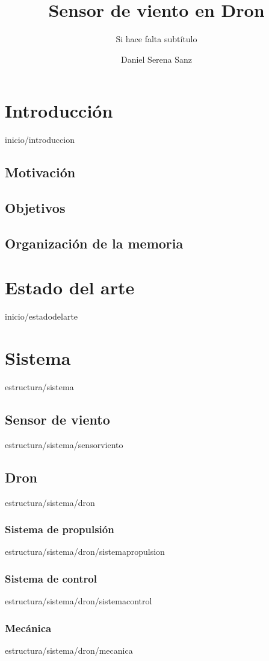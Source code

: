 \documentclass[epsbased,copyright,final,printable,covers,extendedindex,firstnumbered,tfg,gnuplot]{tfgtfmthesisuam}
\title{Sensor de viento en Dron}
\subtitle{Si hace falta subtítulo}
\author{Daniel Serena Sanz}
\begin{document}
\chapter{Introducción\label{CAP:INTRODUCCION}}{inicio/introduccion}
	\section{Motivación}
	\section{Objetivos}
	\section{Organización de la memoria}
\chapter{Estado del arte\label{CAP:ESTADODELARTE}}{inicio/estadodelarte}
\chapter{Sistema\label{CAP:SISTEMA}}{estructura/sistema}

	\section{Sensor de viento\label{SEC:SENSORVIENTO}}{estructura/sistema/sensorviento}

	\section{Dron\label{SEC:DRON}}{estructura/sistema/dron}
		\subsection{Sistema de propulsión\label{SS:SISTPROPULSION}}{estructura/sistema/dron/sistemapropulsion}
		\subsection{Sistema de control\label{SS:SISTCONTROL}}{estructura/sistema/dron/sistemacontrol}
		\subsection{Mecánica\label{SS:MECANICA}}{estructura/sistema/dron/mecanica}
		
\end{document}
